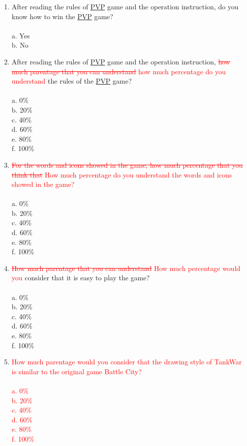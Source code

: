 \documentclass[12pt, titlepage]{article}
\begin{document}
\begin{enumerate}
\item After reading the rules of \underline{PVP} game and the operation instruction, do you know how to win the \underline{PVP} game?\\\\
a. Yes\\
b. No

\item After reading the rules of \underline{PVP} game and the operation instruction, \textcolor{red}{\sout{how much parentage that you can understand} how much percentage do you understand} the rules of the \underline{PVP} game?\\\\
a. 0\%\\
b. 20\%\\
c. 40\%\\
d. 60\%\\
e. 80\%\\
f. 100\%\\

\item \textcolor{red}{\sout{For the words and icons showed in the game, how much percentage that you think that} How much percentage do you understand the words and icons showed in the game?}\\\\
a. 0\%\\
b. 20\%\\
c. 40\%\\
d. 60\%\\
e. 80\%\\
f. 100\%\\

\item \textcolor{red}{\sout{How much parentage that you can understand} How much percentage would you} consider that it is easy to play the game?\\\\
a. 0\%\\
b. 20\%\\
c. 40\%\\
d. 60\%\\
e. 80\%\\
f. 100\%\\

\item \textcolor{red}{How much parentage would you consider that the drawing style of TankWar is similar to the original game Battle City?}\\\\
\textcolor{red}{a. 0\%\\}
\textcolor{red}{b. 20\%\\}
\textcolor{red}{c. 40\%\\}
\textcolor{red}{d. 60\%\\}
\textcolor{red}{e. 80\%\\}
\textcolor{red}{f. 100\%\\}


\end{enumerate}
\end{document}
